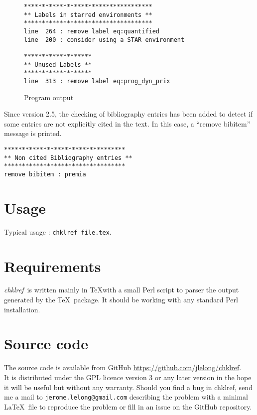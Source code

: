 \documentclass[a4paper,11pt,twoside]{article}
\def\chk{{\it chklref}}
\begin{document}
\begin{figure}[htbp]
  \centering
\begin{verbatim}
************************************
** Labels in starred environments **
************************************
line  264 : remove label eq:quantified
line  200 : consider using a STAR environment

*******************
** Unused Labels **
*******************
line  313 : remove label eq:prog_dyn_prix
\end{verbatim}
  \caption{Program output}
  \label{fig:output}
\end{figure}

Since version 2.5, the checking of bibliography entries has been added to
detect if some entries are not explicitly cited in the text. In this case, a
``remove bibitem'' message is printed.
\begin{verbatim}
**********************************
** Non cited Bibliography entries **
**********************************
remove bibitem : premia
\end{verbatim}


\section{Usage}

Typical usage : \verb!chklref file.tex!.
\\


\section{Requirements}

\chk\ is written mainly in \TeX with a small Perl script to parser the output
generated by the \TeX\ package. It should be working with any standard Perl
installation.

\section{Source code}

The source code is available from GitHub
\url{https://github.com/jlelong/chklref}.
\\

\noindent It is distributed under the GPL licence version 3 or any later version
in the hope it will be useful but without any warranty. Should you find a bug in
chklref, send me a mail to \verb!jerome.lelong@gmail.com! describing the problem
with a minimal \LaTeX\ file to reproduce the problem or fill in an issue on the
GitHub repository.
\end{document}
